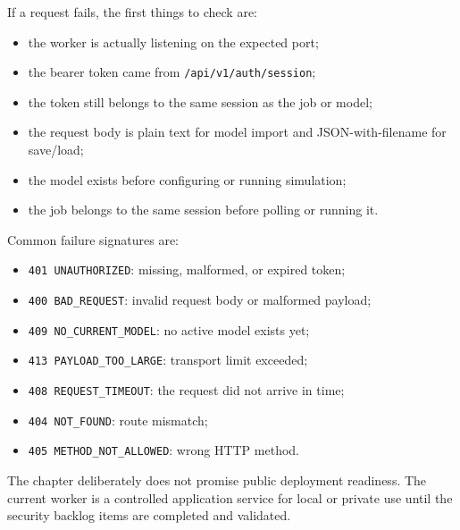 If a request fails, the first things to check are:
\begin{itemize}
\item the worker is actually listening on the expected port;
\item the bearer token came from \texttt{/api/v1/auth/session};
\item the token still belongs to the same session as the job or model;
\item the request body is plain text for model import and JSON-with-filename
for save/load;
\item the model exists before configuring or running simulation;
\item the job belongs to the same session before polling or running it.
\end{itemize}

Common failure signatures are:
\begin{itemize}
\item \texttt{401 UNAUTHORIZED}: missing, malformed, or expired token;
\item \texttt{400 BAD\_REQUEST}: invalid request body or malformed payload;
\item \texttt{409 NO\_CURRENT\_MODEL}: no active model exists yet;
\item \texttt{413 PAYLOAD\_TOO\_LARGE}: transport limit exceeded;
\item \texttt{408 REQUEST\_TIMEOUT}: the request did not arrive in time;
\item \texttt{404 NOT\_FOUND}: route mismatch;
\item \texttt{405 METHOD\_NOT\_ALLOWED}: wrong HTTP method.
\end{itemize}

The chapter deliberately does not promise public deployment readiness. The
current worker is a controlled application service for local or private use
until the security backlog items are completed and validated.
